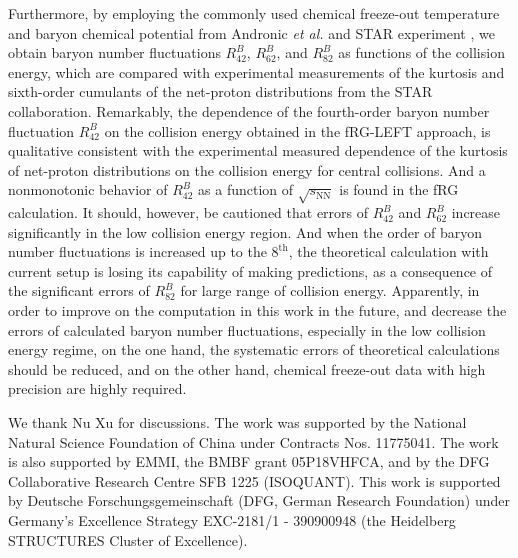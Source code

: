 \documentclass[%
reprint,
superscriptaddress,
showpacs,preprintnumbers,
amsmath,amssymb,
aps,
prd,
]{revtex4-1}
\begin{document}
Furthermore, by employing the commonly used chemical freeze-out temperature and baryon chemical potential from Andronic {\it et al.} \cite{Andronic:2017pug} and STAR experiment \cite{Adamczyk:2017iwn}, we obtain baryon number fluctuations $R^{B}_{42}$, $R^{B}_{62}$, and $R^{B}_{82}$ as functions of the collision energy, which are compared with experimental measurements of the kurtosis and sixth-order cumulants of the net-proton distributions from the STAR collaboration. Remarkably, the dependence of the fourth-order baryon number fluctuation $R^{B}_{42}$ on the collision energy obtained in the fRG-LEFT approach, is qualitative consistent with the experimental measured dependence of the kurtosis of net-proton distributions on the collision energy for central collisions. And a nonmonotonic behavior of $R^{B}_{42}$ as a function of $\sqrt{s_{\mathrm{NN}}}$ is found in the fRG calculation. It should, however, be cautioned that errors of $R^{B}_{42}$ and $R^{B}_{62}$ increase significantly in the low collision energy region. And when the order of baryon number fluctuations is increased up to the $8^{\mathrm{th}}$, the theoretical calculation with current setup is losing its capability of making predictions, as a consequence of the significant errors of $R^{B}_{82}$ for large range of collision energy. Apparently, in order to improve on the computation in this work in the future, and decrease the errors of calculated baryon number fluctuations, especially in the low collision energy regime, on the one hand, the systematic errors of theoretical calculations should be reduced, and on the other hand, chemical freeze-out data with high precision are highly required.
	
	
	
	
\begin{acknowledgments}
		
We thank Nu Xu for discussions. The work was supported by the National Natural Science Foundation of China under Contracts Nos. 11775041. The work is also supported by EMMI, the BMBF grant 05P18VHFCA, and by the DFG Collaborative Research Centre SFB 1225 (ISOQUANT). This work is supported by Deutsche Forschungsgemeinschaft (DFG, German Research Foundation) under Germany’s Excellence Strategy EXC-2181/1 - 390900948 (the Heidelberg STRUCTURES Cluster of Excellence).
		
\end{acknowledgments}
\end{document}
